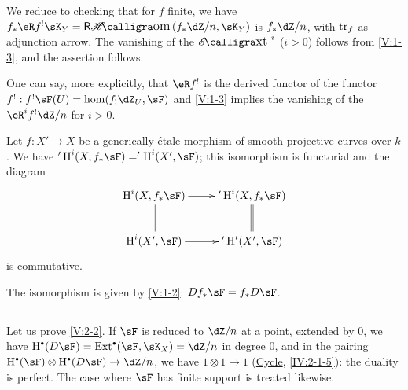 We reduce to checking that for $f$ finite, we have
$f_\ast \eR f^!\sK_Y = \rHom(f_\ast\dZ/n,\sK_Y)$ is $f_\ast\dZ/n$, with $\operatorname{tr}_f$
as adjunction arrow. The vanishing of the $\Ext^i$ ($i>0$) follows from
\ref{V:1-3}, and the assertion follows.

One can say, more explicitly, that $\eR f^!$ is the derived functor of the
functor $f^!:f^!\sF(U)=\hom(f_!\dZ_U,\sF)$ and \ref{V:1-3} implies the
vanishing of the $\eR^i f^!\dZ/n$ for $i>0$.




\begin{corollary_}\label{V:2-4}
Let $f:X'\to X$ be a generically \'etale morphism of smooth
projective curves over $k$. We have $'\h^i(X,f_\ast \sF)='\h^i(X',\sF)$; this
isomorphism is functorial and the diagram
\[\xymatrix{
  \h^i(X,f_\ast\sF) \ar[r] \ar@{=}[d]
    & '\h^i(X,f_\ast\sF) \ar@{=}[d] \\
  \h^i(X',\sF) \ar[r]
    & '\h^i(X',\sF)
}\]
is commutative.
\end{corollary_}

The isomorphism is given by \ref{V:1-2}: $D f_\ast\sF=f_\ast D\sF$.




\subsection{}\label{V:2-5}

Let us prove \ref{V:2-2}. If $\sF$ is reduced to $\dZ/n$ at a point, extended
by $0$, we have $\h^\bullet(D\sF) = \ext^\bullet(\sF,\sK_X)=\dZ/n$ in degree
$0$, and in the pairing $\h^\bullet(\sF)\otimes\h^\bullet(D\sF) \to \dZ/n$,
we have $1\otimes 1\mapsto 1$ (\hyperref[IV]{Cycle}, \ref{IV:2-1-5}): the duality
is perfect. The case where $\sF$ has finite support is treated likewise.

